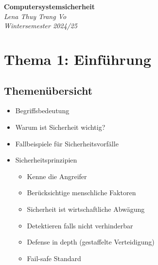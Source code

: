 \documentclass[a4paper, 10pt]{article}
\begin{document}
\begin{titlepage}
    \centering
    \vspace*{3cm}
    {\Huge \textbf{Computersystemsicherheit}}\\[1.5cm]
    {\large \textit{Lena Thuy Trang Vo}}\\[0.5cm]
    {\large \textit{Wintersemester 2024/25}}\\[2cm]

    \vfill
\end{titlepage}

\tableofcontents
\newpage

\section{Thema 1: Einführung}
\subsection{Themenübersicht}
\begin{itemize}
    \item Begriffsbedeutung
    \item Warum ist Sicherheit wichtig?
    \item Fallbeispiele für Sicherheitsvorfälle
    \item Sicherheitsprinzipien
    \begin{itemize}
        \item Kenne die Angreifer 
        \item Berücksichtige menschliche Faktoren
        \item Sicherheit ist wirtschaftliche Abwägung 
        \item Detektieren falls nicht verhinderbar
        \item Defense in depth (gestaffelte Verteidigung)
        \item Fail-safe Standard
    \end{itemize}
\end{itemize}
\end{document}
